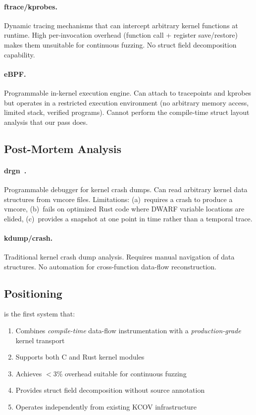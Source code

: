 \documentclass{ndss}
\begin{document}
\paragraph{ftrace/kprobes.} Dynamic tracing mechanisms that can intercept
arbitrary kernel functions at runtime. High per-invocation overhead (function
call + register save/restore) makes them unsuitable for continuous fuzzing.
No struct field decomposition capability.

\paragraph{eBPF.} Programmable in-kernel execution engine. Can attach to
tracepoints and kprobes but operates in a restricted execution environment
(no arbitrary memory access, limited stack, verified programs). Cannot perform
the compile-time struct layout analysis that our pass does.

\subsection{Post-Mortem Analysis}

\paragraph{drgn~\cite{drgn}.} Programmable debugger for kernel crash dumps.
Can read arbitrary kernel data structures from vmcore files. Limitations:
(a)~requires a crash to produce a vmcore, (b)~fails on optimized Rust code
where DWARF variable locations are elided, (c)~provides a snapshot at one
point in time rather than a temporal trace.

\paragraph{kdump/crash.} Traditional kernel crash dump analysis. Requires
manual navigation of data structures. No automation for cross-function
data-flow reconstruction.

\subsection{Positioning}

\toolname{} is the first system that:
\begin{enumerate}[nosep]
  \item Combines \emph{compile-time} data-flow instrumentation with a
        \emph{production-grade} kernel transport
  \item Supports both C and Rust kernel modules
  \item Achieves $<$3\% overhead suitable for continuous fuzzing
  \item Provides struct field decomposition without source annotation
  \item Operates independently from existing KCOV infrastructure
\end{enumerate}
\end{document}
